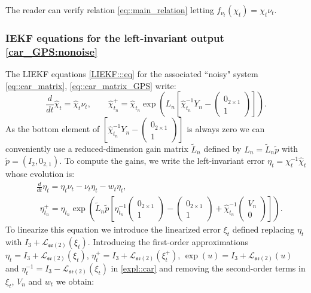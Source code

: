 \documentclass[a4paper,12pt,onecolumn]{article}
\begin{document}
The reader can verify relation \eqref{eq::main_relation} letting $f_{\nu_t}(\chi_t)=\chi_t\nu_t$.



\subsubsection{IEKF equations for the left-invariant output \eqref{car_GPS:nonoise}}
\label{ex::car_GPS}
The LIEKF  equations \eqref{LIEKF:::eq} for the associated ``noisy" system \eqref{eq::car_matrix}, \eqref{eq::car_matrix_GPS} write:
\begin{equation*}
\frac{d}{dt} \hat{\chi}_t  = \hat{\chi}_t \nu_t 
 , \qquad
\hat{\chi}^+_{t_n}  = \hat{\chi}_{t_n} \exp \left( L_n \left[ \hat{\chi}_{t_n}^{-1} Y_n -
\begin{pmatrix}
0_{2 \times 1} \\ 1
\end{pmatrix}
\right] \right).
\end{equation*}
As the bottom element of $ \left[ \hat{\chi}_{t_n}^{-1} Y_n -
\begin{pmatrix}
0_{2 \times 1} \\ 1
\end{pmatrix} \right]$ is always zero we can conveniently use a reduced-dimension gain matrix $\tilde{L}_n$ defined by $L_n = \tilde{L}_n \tilde{p}$ with $\tilde{p}=(I_2, 0_{2,1})$. To compute the gains, we write the left-invariant error  $
\eta_t = \chi_t^{-1} \hat{\chi}_t
$
whose evolution is:
\begin{equation}\begin{aligned}
&\frac{d}{dt} \eta_t = \eta_t \nu_t - \nu_t \eta_t - w_t \eta_t,\\&~~\eta_{t_n}^+ = \eta_{t_n} \exp \left( \tilde{L}_n \tilde{p} \left[ \eta_{t_n}^{-1} \begin{pmatrix} 0_{2 \times 1} \\ 1 \end{pmatrix}- \begin{pmatrix} 0_{2 \times 1} \\ 1 \end{pmatrix}+\hat{\chi}_{t_n}^{-1} \begin{pmatrix} V_n \\ 0 \end{pmatrix} \right] \right).\label{expl::car}
\end{aligned}\end{equation}
To linearize this equation we introduce the linearized error $\xi_t$ defined replacing $\eta_t$ with $I_3 + \mathcal{L}_{\mathfrak{se}(2)}(\xi_t)$. Introducing the first-order approximations $\eta_t = I_3 + \mathcal{L}_{\mathfrak{se}(2)}(\xi_t)$, $\eta_t^+ = I_3 + \mathcal{L}_{\mathfrak{se}(2)}(\xi_t^+)$, $\exp(u)=I_3+\mathcal{L}_{\mathfrak{se}(2)}(u)$ and $\eta_t^{-1} = I_3 - \mathcal{L}_{\mathfrak{se}(2)}(\xi_t) $ in \eqref{expl::car} and removing the second-order terms in $\xi_t$, $V_n$ and $w_t$ we obtain:
\end{document}

